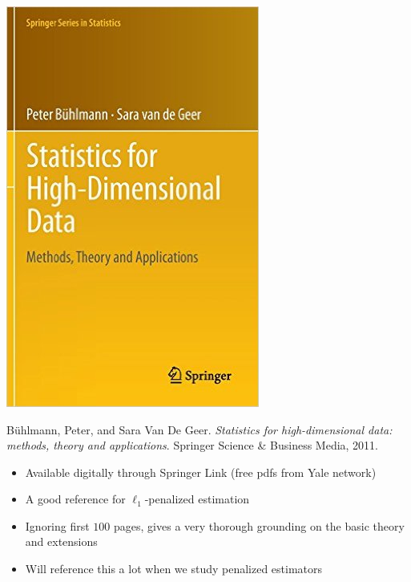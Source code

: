 \begin{frame}[fragile] \frametitle{}

\noindent
\begin{minipage}{0.5\textwidth}
\includegraphics[width=0.9\linewidth]{img/buhlmann.jpg}
\end{minipage}%
\begin{minipage}{0.5\textwidth}
Bühlmann, Peter, and Sara Van De Geer. {\it Statistics for high-dimensional data: methods, theory and applications}. Springer Science \& Business Media, 2011. \\
\begin{itemize}
\item Available digitally through Springer Link (free pdfs from Yale network)
\item A good reference for $\ell_1$-penalized estimation
\item Ignoring first $100$ pages, gives a very thorough grounding on the basic theory and extensions
\item Will reference this a lot when we study penalized estimators
\end{itemize}
\end{minipage}
\end{frame}

